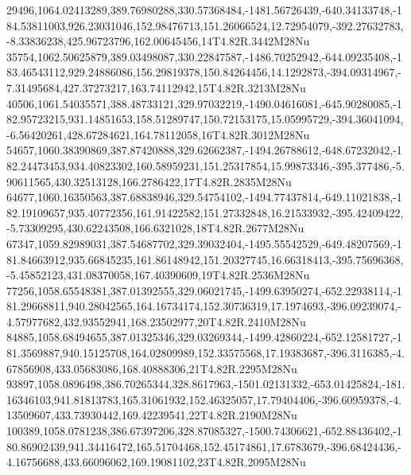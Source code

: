 29496,1064.02413289,389.76980288,330.57368484,-1481.56726439,-640.34133748,-184.53811003,926.23031046,152.98476713,151.26066524,12.72954079,-392.27632783,-8.33836238,425.96723796,162.00645456,14T4.82R.3442M28Nu
35754,1062.50625879,389.03498087,330.22847587,-1486.70252942,-644.09235408,-183.46543112,929.24886086,156.29819378,150.84264456,14.1292873,-394.09314967,-7.31495684,427.37273217,163.74112942,15T4.82R.3213M28Nu
40506,1061.54035571,388.48733121,329.97032219,-1490.04616081,-645.90280085,-182.95723215,931.14851653,158.51289747,150.72153175,15.05995729,-394.36041094,-6.56420261,428.67284621,164.78112058,16T4.82R.3012M28Nu
54657,1060.38390869,387.87420888,329.62662387,-1494.26788612,-648.67232042,-182.24473453,934.40823302,160.58959231,151.25317854,15.99873346,-395.377486,-5.90611565,430.32513128,166.2786422,17T4.82R.2835M28Nu
64677,1060.16350563,387.68838946,329.54754102,-1494.77437814,-649.11021838,-182.19109657,935.40772356,161.91422582,151.27332848,16.21533932,-395.42409422,-5.73309295,430.62243508,166.6321028,18T4.82R.2677M28Nu
67347,1059.82989031,387.54687702,329.39032404,-1495.55542529,-649.48207569,-181.84663912,935.66845235,161.86148942,151.20327745,16.66318413,-395.75696368,-5.45852123,431.08370058,167.40390609,19T4.82R.2536M28Nu
77256,1058.65548381,387.01392555,329.06021745,-1499.63950274,-652.22938114,-181.29668811,940.28042565,164.16734174,152.30736319,17.1974693,-396.09239074,-4.57977682,432.93552941,168.23502977,20T4.82R.2410M28Nu
84885,1058.68494655,387.01325346,329.03269344,-1499.42860224,-652.12581727,-181.3569887,940.15125708,164.02809989,152.33575568,17.19383687,-396.3116385,-4.67856908,433.05683086,168.40888306,21T4.82R.2295M28Nu
93897,1058.0896498,386.70265344,328.8617963,-1501.02131332,-653.01425824,-181.16346103,941.81813783,165.31061932,152.46325057,17.79404406,-396.60959378,-4.13509607,433.73930442,169.42239541,22T4.82R.2190M28Nu
100389,1058.0781238,386.67397206,328.87085327,-1500.74306621,-652.88436402,-180.86902439,941.34416472,165.51704468,152.45174861,17.6783679,-396.68424436,-4.16756688,433.66096062,169.19081102,23T4.82R.2095M28Nu

